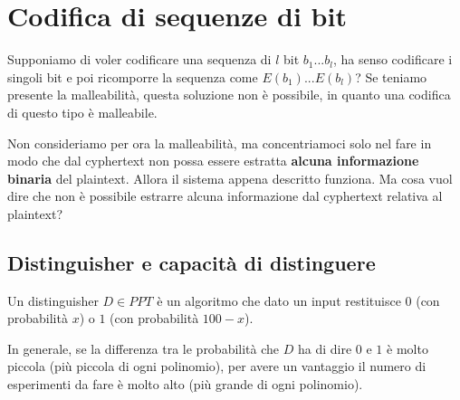 \setchapterpreamble[u]{\margintoc}
\chapter{Codifica di sequenze di bit}

Supponiamo di voler codificare una sequenza di $l$ bit $b_1 ... b_l$, ha senso codificare i singoli bit e poi ricomporre la sequenza come $E(b_1) ... E(b_l)$? Se teniamo presente la malleabilità, questa soluzione non è possibile, in quanto una codifica di questo tipo è malleabile. 

Non consideriamo per ora la malleabilità, ma concentriamoci solo nel fare in modo che dal cyphertext non possa essere estratta \textbf{alcuna informazione binaria} del plaintext. Allora il sistema appena descritto funziona. Ma cosa vuol dire che non è possibile estrarre alcuna informazione dal cyphertext relativa al plaintext?

\section{Distinguisher e capacità di distinguere}

\begin{definition}
Un distinguisher $D \in PPT$ è un algoritmo che dato un input restituisce $0$ (con probabilità $x$) o $1$ (con probabilità $100-x$).

In generale, se la differenza tra le probabilità che $D$ ha di dire $0$ e $1$ è molto piccola (più piccola di ogni polinomio), per avere un vantaggio il numero di esperimenti da fare è molto alto (più grande di ogni polinomio).\\
\end{definition}

